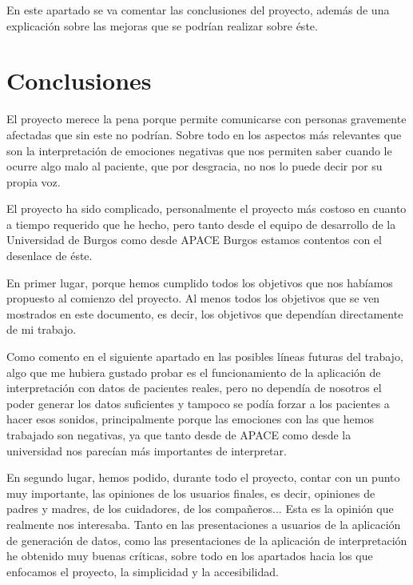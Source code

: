 
En este apartado se va comentar las conclusiones del proyecto, además de una explicación sobre las mejoras que se podrían realizar sobre éste.

\section{Conclusiones}
El proyecto merece la pena porque permite comunicarse con personas gravemente afectadas  que sin este no podrían. Sobre todo en los aspectos más relevantes que son la interpretación de emociones negativas que nos permiten saber cuando le ocurre algo malo al paciente, que por desgracia, no nos lo puede decir por su propia voz.

El proyecto ha sido complicado, personalmente el proyecto más costoso en cuanto a tiempo requerido que he hecho, pero tanto desde el equipo de desarrollo de la Universidad de Burgos como desde APACE Burgos estamos contentos con el desenlace de éste.

En primer lugar, porque hemos cumplido todos los objetivos que nos habíamos propuesto al comienzo del proyecto. Al menos todos los objetivos que se ven mostrados en este documento, es decir, los objetivos que dependían directamente de mi trabajo. 

Como comento en el siguiente apartado en las posibles líneas futuras del trabajo, algo que me hubiera gustado probar es el funcionamiento de la aplicación de interpretación con datos de pacientes reales, pero no dependía de nosotros el poder generar los datos suficientes y tampoco se podía forzar a los pacientes a hacer esos sonidos, principalmente porque las emociones con las que hemos trabajado son negativas, ya que tanto desde de APACE como desde la universidad nos parecían más importantes de interpretar.

En segundo lugar, hemos podido, durante todo el proyecto, contar con un punto muy importante, las opiniones de los usuarios finales, es decir, opiniones de padres y madres, de los cuidadores, de los compañeros... Esta es la opinión que realmente nos interesaba. Tanto en las presentaciones a usuarios de la aplicación de generación de datos, como las presentaciones de la aplicación de interpretación he obtenido muy buenas críticas, sobre todo en los apartados hacia los que enfocamos el proyecto, la simplicidad y la accesibilidad.

